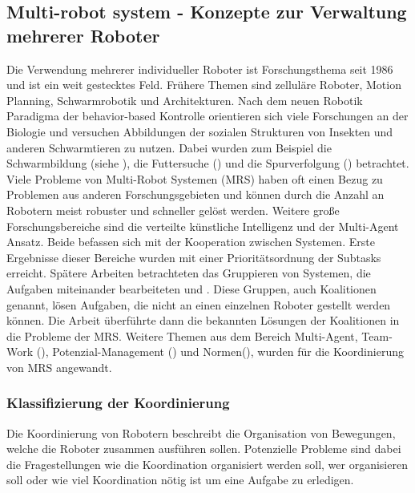\subsection{Multi-robot system - Konzepte zur Verwaltung mehrerer Roboter}
\label{sec:relatedwork-multirobots}
    
Die Verwendung mehrerer individueller Roboter ist Forschungsthema seit 1986 und ist ein weit gestecktes Feld. Frühere Themen sind zelluläre Roboter, Motion Planning, Schwarmrobotik und Architekturen. Nach dem neuen Robotik Paradigma der behavior-based Kontrolle orientieren sich viele Forschungen an der Biologie und versuchen Abbildungen der sozialen Strukturen von Insekten und anderen Schwarmtieren zu nutzen.\cite{parker2003current} Dabei wurden zum Beispiel die Schwarmbildung (siehe \cite{hayes2002self}), die Futtersuche (\cite{balch1999impact}) und die Spurverfolgung (\cite{vaughan2000whistling}) betrachtet. Viele Probleme von Multi-Robot Systemen (MRS) haben oft einen Bezug zu Problemen aus anderen Forschungsgebieten und können durch die Anzahl an Robotern meist robuster und schneller gelöst werden. Weitere große Forschungsbereiche sind die verteilte künstliche Intelligenz und der Multi-Agent Ansatz. Beide befassen sich mit der Kooperation zwischen Systemen. Erste Ergebnisse dieser Bereiche wurden mit einer Prioritätsordnung der Subtasks erreicht\cite{durfee1987coherent}. Spätere Arbeiten betrachteten das Gruppieren von Systemen, die Aufgaben miteinander bearbeiteten \cite{shehory1998methods} und \cite{lau2003task}. Diese Gruppen, auch Koalitionen genannt, lösen Aufgaben, die nicht an einen einzelnen Roboter gestellt werden können. Die Arbeit \cite{vig2005issues} überführte dann die bekannten Lösungen der Koalitionen in die Probleme der MRS. Weitere Themen aus dem Bereich Multi-Agent, Team-Work (\cite{pynadath2003automated}), Potenzial-Management (\cite{timm2003ontology}) und Normen(\cite{boella2002norms}), wurden für die Koordinierung von MRS angewandt.\cite{lundh2006plan}

\subsubsection{Klassifizierung der Koordinierung}
Die Koordinierung von Robotern beschreibt die Organisation von Bewegungen, welche die Roboter zusammen ausführen sollen. Potenzielle Probleme sind dabei die Fragestellungen wie die Koordination organisiert werden soll, wer organisieren soll oder wie viel Koordination nötig ist um eine Aufgabe zu erledigen.

